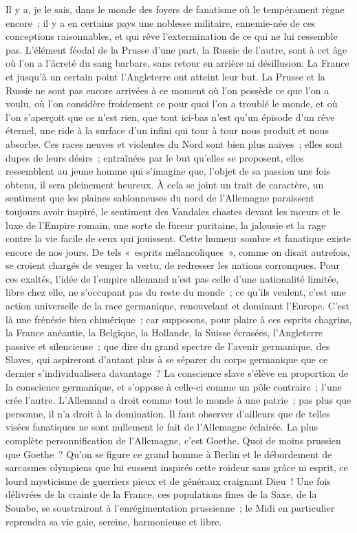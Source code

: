 \documentclass[french,twoside]{book} %
\begin{document}
Il y a, je le sais, dans le monde des foyers de fanatisme où le tempérament règne encore ; il y a en certains pays une noblesse militaire, ennemie-née de ces conceptions raisonnables, et qui rêve l’extermination de ce qui ne lui ressemble pas. L’élément féodal de la Prusse d’une part, la Russie de l’autre, sont à cet âge où l’on a l’âcreté du sang barbare, sans retour en arrière ni désillusion. La France et jusqu’à un certain point l’Angleterre ont atteint leur but. La Prusse et la Russie ne sont pas encore arrivées à ce moment où l’on possède ce que l’on a voulu, où l’on considère froidement ce pour quoi l’on a troublé le monde, et où l’on s’aperçoit que ce n’est rien, que tout ici-bas n’est qu’un épisode d’un rêve éternel, une ride à la surface d’un infini qui tour à tour nous produit et nous absorbe. Ces races neuves et violentes du Nord sont bien plus naïves ; elles sont dupes de leurs désirs ; entraînées par le but qu’elles se proposent, elles ressemblent au jeune homme qui s’imagine que, l’objet de sa passion une fois obtenu, il sera pleinement heureux. À cela se joint un trait de caractère, un sentiment que les plaines sablonneuses du nord de l’Allemagne paraissent toujours avoir inspiré, le sentiment des Vandales chastes devant les mœurs et le luxe de l’Empire romain, une sorte de fureur puritaine, la jalousie et la rage contre la vie facile de ceux qui jouissent. Cette humeur sombre et fanatique existe encore de nos jours. De tels « esprits mélancoliques », comme on disait autrefois, se croient chargés de venger la vertu, de redresser les nations corrompues. Pour ces exaltés, l’idée de l’empire allemand n’est pas celle d’une nationalité limitée, libre chez elle, ne s’occupant pas du reste du monde ; ce qu’ils veulent, c’est une action universelle de la race germanique, renouvelant et dominant l’Europe. C’est là une frénésie bien chimérique ; car supposons, pour plaire à ces esprits chagrins, la France anéantie, la Belgique, la Hollande, la Suisse écrasées, l’Angleterre passive et silencieuse ; que dire du grand spectre de l’avenir germanique, des Slaves, qui aspireront d’autant plus à se séparer du corps germanique que ce dernier s’individualisera davantage ? La conscience slave s’élève en proportion de la conscience germanique, et s’oppose à celle-ci comme un pôle contraire ; l’une crée l’autre. L’Allemand a droit comme tout le monde à une patrie ; pas plus que personne, il n’a droit à la domination. Il faut observer d’ailleurs que de telles visées fanatiques ne sont nullement le fait de l’Allemagne éclairée. La plus complète personnification de l’Allemagne, c’est Goethe. Quoi de moins prussien que Goethe ? Qu’on se figure ce grand homme à Berlin et le débordement de sarcasmes olympiens que lui eussent inspirés cette roideur sans grâce ni esprit, ce lourd mysticisme de guerriers pieux et de généraux craignant Dieu ! Une fois délivrées de la crainte de la France, ces populations fines de la Saxe, de la Souabe, se soustrairont à l’enrégimentation prussienne ; le Midi en particulier reprendra sa vie gaie, sereine, harmonieuse et libre.\par
\end{document}
